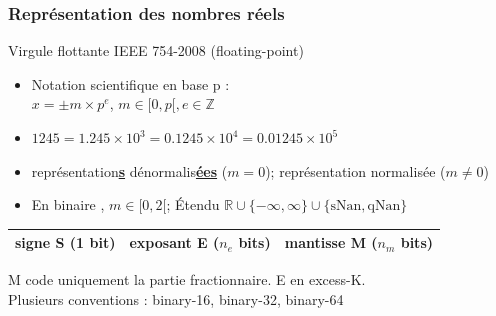 \documentclass{beamer}
\begin{document}
\begin{frame}
\frametitle{Représentation des nombres réels}
\begin{block}{Virgule flottante IEEE 754-2008 (floating-point)}
\begin{itemize}
\item Notation scientifique en base p :\\
 $x = \pm m \times p^{e}$, $m \in [0, p[, e \in \mathbb{Z}$
\item $1245 = 1.245 \times 10^3 = 0.1245 \times 10^4 = 0.01245 \times 10^5$
\item représentation\underline{\textbf{s}} dénormalis\underline{\textbf{ées}} ($m = 0$); représentation normalisée ($m \neq 0$)
\item En binaire , $m \in [0, 2[$; {\'E}tendu $\mathbb{R} \cup \{-\infty, \infty\} \cup \{\mbox{sNan}, \mbox{qNan}\}$
\end{itemize}
\begin{center}\begin{tabular}{|c|c|c|}
\hline
signe S (1 bit)& exposant E ($n_e$ bits)& mantisse M ($n_m$ bits)\\
\hline
\end{tabular}
\end{center}
M code uniquement la partie fractionnaire. E en excess-K.\\
Plusieurs conventions : binary-16, binary-32, binary-64
\end{block}
\end{frame}
\end{document}
